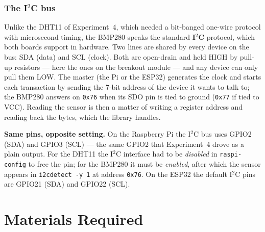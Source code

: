 \documentclass[10pt,a4paper]{article}
\begin{document}
\subsubsection{The I$^2$C bus}
Unlike the DHT11 of Experiment~4, which needed a bit-banged one-wire protocol with
microsecond timing, the BMP280 speaks the standard \textbf{I$^2$C} protocol, which both
boards support in hardware. Two lines are shared by every device on the bus: SDA (data)
and SCL (clock). Both are open-drain and held HIGH by pull-up resistors --- here the
ones on the breakout module --- and any device can only pull them LOW. The master
(the Pi or the ESP32) generates the clock and starts each transaction by sending the
7-bit address of the device it wants to talk to; the BMP280 answers on \texttt{0x76}
when its SDO pin is tied to ground (\texttt{0x77} if tied to VCC). Reading the sensor is
then a matter of writing a register address and reading back the bytes, which the
library handles.

\begin{notebox}
\textbf{Same pins, opposite setting.} On the Raspberry Pi the I$^2$C bus uses GPIO2
(SDA) and GPIO3 (SCL) --- the same GPIO2 that Experiment~4 drove as a plain output.
For the DHT11 the I$^2$C interface had to be \emph{disabled} in \texttt{raspi-config}
to free the pin; for the BMP280 it must be \emph{enabled}, after which the sensor
appears in \texttt{i2cdetect -y 1} at address \texttt{0x76}. On the ESP32 the default
I$^2$C pins are GPIO21 (SDA) and GPIO22 (SCL).
\end{notebox}

\section{Materials Required}
\end{document}
